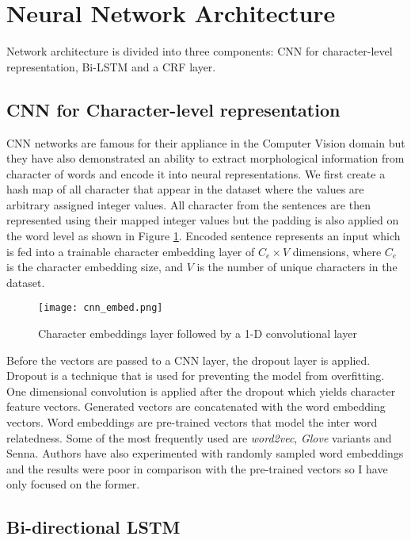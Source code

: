 \section{Neural Network Architecture}
Network architecture is divided into three components: CNN for character-level
representation, Bi-LSTM and a CRF layer.

\subsection{CNN for Character-level representation}
CNN networks are famous for their appliance in the Computer Vision domain but
they have also demonstrated an ability to extract morphological information
from character of words and encode it into neural
representations\cite{cnn_repr}. We first create a hash map of all character
that appear in the dataset where the values are arbitrary assigned integer
values. All character from the sentences are then represented using their 
mapped integer values but the padding is also applied on the word level as
shown in Figure \ref{fig:cnn_embed}.
Encoded sentence represents an input which is fed into a trainable character embedding
layer of $C_e \times V$ dimensions, where $C_e$ is the character embedding size,
and $V$ is the number of unique characters in the dataset.

\begin{figure}
  \caption{Character embeddings layer followed by a 1-D convolutional layer}
  \label{fig:cnn_embed}
  \centering
    \texttt{[image: cnn\_embed.png]}
\end{figure}

Before the vectors are passed to a CNN layer, the dropout\cite{dropout} layer is
applied. Dropout is a technique that is used for preventing the model from
overfitting\cite{overfit}. One dimensional convolution is applied after the dropout which
yields character feature vectors. Generated vectors are concatenated with the word
embedding vectors\cite{word_embedding}. Word embeddings are pre-trained vectors
that model the inter word relatedness. Some of the most frequently used are
\textit{word2vec}\cite{w2vec}, \textit{Glove} variants\cite{glove} and
Senna\cite{senna}. Authors have also experimented with randomly sampled word
embeddings and the results were poor in comparison with the pre-trained vectors
so I have only focused on the former.

\subsection{Bi-directional LSTM}

